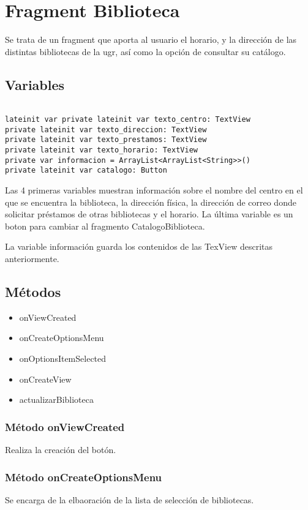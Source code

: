 \section{Fragment Biblioteca}
Se trata de un fragment que aporta al usuario el horario, y la dirección de las distintas bibliotecas de la ugr, así como la opción  de consultar su catálogo.

\subsection{Variables}

\begin{lstlisting}

lateinit var private lateinit var texto_centro: TextView
private lateinit var texto_direccion: TextView
private lateinit var texto_prestamos: TextView
private lateinit var texto_horario: TextView
private var informacion = ArrayList<ArrayList<String>>()
private lateinit var catalogo: Button

\end{lstlisting}

Las 4 primeras variables muestran información sobre el nombre del centro en el que se encuentra la biblioteca, la dirección física, la dirección de correo donde solicitar préstamos de otras bibliotecas y el horario. La última variable es un boton para cambiar al fragmento CatalogoBiblioteca.

La variable información guarda los contenidos de las TexView descritas anteriormente.

\subsection{Métodos}

\begin{itemize}
\item{onViewCreated}
\item{onCreateOptionsMenu}
\item{onOptionsItemSelected}
\item{onCreateView}
\item{actualizarBiblioteca}
\end{itemize}

\subsubsection{Método onViewCreated}
Realiza la creación del botón.

\subsubsection{Método onCreateOptionsMenu}
Se encarga de la elbaoración de la lista de selección de bibliotecas.


